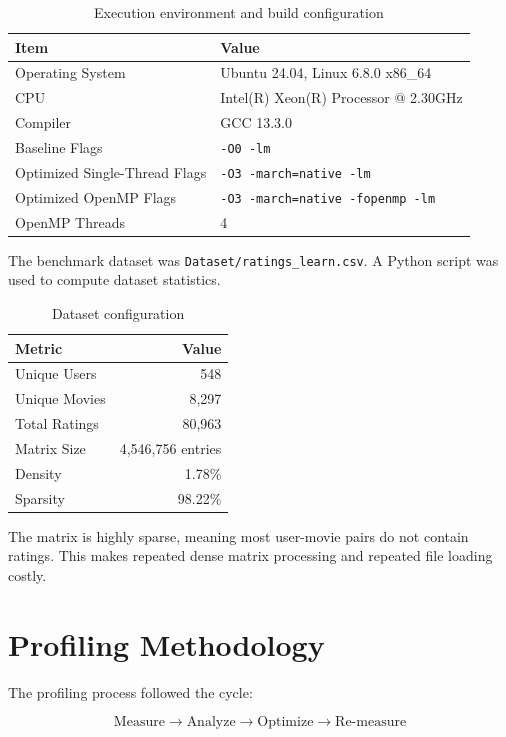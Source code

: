 \documentclass[11pt]{article}
\begin{document}
\begin{table}[H]
\centering
\caption{Execution environment and build configuration}
\begin{tabular}{ll}
\toprule
\textbf{Item} & \textbf{Value} \\
\midrule
Operating System & Ubuntu 24.04, Linux 6.8.0 x86\_64 \\
CPU & Intel(R) Xeon(R) Processor @ 2.30GHz \\
Compiler & GCC 13.3.0 \\
Baseline Flags & \texttt{-O0 -lm} \\
Optimized Single-Thread Flags & \texttt{-O3 -march=native -lm} \\
Optimized OpenMP Flags & \texttt{-O3 -march=native -fopenmp -lm} \\
OpenMP Threads & 4 \\
\bottomrule
\end{tabular}
\end{table}

The benchmark dataset was \texttt{Dataset/ratings\_learn.csv}. A Python script was used to compute dataset statistics.

\begin{table}[H]
\centering
\caption{Dataset configuration}
\begin{tabular}{lr}
\toprule
\textbf{Metric} & \textbf{Value} \\
\midrule
Unique Users & 548 \\
Unique Movies & 8,297 \\
Total Ratings & 80,963 \\
Matrix Size & 4,546,756 entries \\
Density & 1.78\% \\
Sparsity & 98.22\% \\
\bottomrule
\end{tabular}
\end{table}

The matrix is highly sparse, meaning most user-movie pairs do not contain ratings. This makes repeated dense matrix processing and repeated file loading costly.

\section{Profiling Methodology}

The profiling process followed the cycle:

\[
\text{Measure} \rightarrow \text{Analyze} \rightarrow \text{Optimize} \rightarrow \text{Re-measure}
\]
\end{document}
